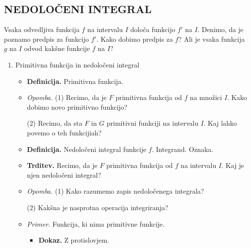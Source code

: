 \subsection{NEDOLOČENI INTEGRAL}
Vsaka odvedljiva funkcija $f$ na intervalu $I$ določa funkcijo $f'$ na $I$. Denimo, da je poznamo predpis za funkcijo $f'$. Kako dobimo predpis za $f$? Ali je vsaka funkcija $g$ na $I$ odvod kakšne funkcije $f$ na $I$?
\begin{enumerate}
    \item Primitivna funkcija in nedoločeni integral
    \begin{itemize}
        \item \colorbox{purple!30}{\textbf{Definicija.}} Primitivna funkcija.
        \item \colorbox{yellow!30}{\emph{Opomba.}} (1) Recimo, da je $F$ primitivna funkcija od $f$ na množici $I$. Kako dobimo novo primitivno funkcijo?
        
        (2) Recimo, da sta $F$ in $G$ primitivni funkciji na intervalu $I$. Kaj lahko povemo o teh funkcijiah?
        \item \colorbox{purple!30}{\textbf{Definicija.}} Nedoločeni integral funkcije $f$. Integrand. Oznaka.
        \item \colorbox{blue!30}{\textbf{Trditev.}} Recimo, da je $F$ primitivna funkcija od $f$ na intervalu $I$. Kaj je njen nedoločeni integral?
        \item \colorbox{yellow!30}{\emph{Opomba.}} (1) Kako razumemo zapis nedoločenega integrala?
        
        (2) Kakšna je nasprotna operacija integriranja?
        \item \colorbox{yellow!30}{\emph{Primer.}} Funkcija, ki nima primitivne funkcije.
        \begin{itemize}
            \item \colorbox{green!30}{\textbf{Dokaz.}} Z protislovjem.
        \end{itemize}
    \end{itemize}


\end{enumerate}

